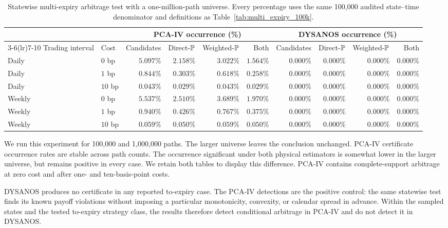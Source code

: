 \begin{table}[H]
\centering
\scriptsize
\setlength{\tabcolsep}{2pt}
\begin{tabular}{llrrrrrrrr}
\toprule
 & & \multicolumn{4}{c}{PCA-IV occurrence (\%)}
       & \multicolumn{4}{c}{DYSANOS occurrence (\%)}\\
\cmidrule(lr){3-6}\cmidrule(lr){7-10}
Trading interval & Cost & Candidates & Direct-$\P$ & Weighted-$\P$ & Both
                         & Candidates & Direct-$\P$ & Weighted-$\P$ & Both\\
\midrule
Daily  & $0$ bp  & $5.097\%$ & $2.158\%$ & $3.022\%$ & $1.564\%$ & $0.000\%$ & $0.000\%$ & $0.000\%$ & $0.000\%$\\
Daily  & $1$ bp  & $0.844\%$ & $0.303\%$ & $0.618\%$ & $0.258\%$ & $0.000\%$ & $0.000\%$ & $0.000\%$ & $0.000\%$\\
Daily  & $10$ bp & $0.043\%$ & $0.029\%$ & $0.043\%$ & $0.029\%$ & $0.000\%$ & $0.000\%$ & $0.000\%$ & $0.000\%$\\
Weekly & $0$ bp  & $5.537\%$ & $2.510\%$ & $3.689\%$ & $1.970\%$ & $0.000\%$ & $0.000\%$ & $0.000\%$ & $0.000\%$\\
Weekly & $1$ bp  & $0.940\%$ & $0.426\%$ & $0.767\%$ & $0.375\%$ & $0.000\%$ & $0.000\%$ & $0.000\%$ & $0.000\%$\\
Weekly & $10$ bp & $0.059\%$ & $0.050\%$ & $0.059\%$ & $0.050\%$ & $0.000\%$ & $0.000\%$ & $0.000\%$ & $0.000\%$\\
\bottomrule
\end{tabular}
\caption{Statewise multi-expiry arbitrage test with a one-million-path
universe. Every percentage uses the same 100,000 audited state--time
denominator and definitions as Table~\ref{tab:multi_expiry_100k}.}
\label{tab:multi_expiry_1m}
\end{table}

We run this experiment for 100,000 and 1,000,000 paths.
The larger universe leaves the conclusion unchanged. PCA-IV certificate
occurrence rates are stable across path counts. The occurrence significant
under both physical estimators is somewhat lower in
the larger universe, but remains positive in every case. We retain both
tables to display this difference. PCA-IV contains complete-support arbitrage
at zero cost and after one- and ten-basis-point costs.

DYSANOS produces no certificate in any reported to-expiry case. The PCA-IV detections are
the positive control: the same statewise test finds its known payoff
violations without imposing a particular monotonicity, convexity, or calendar
spread in advance. Within the sampled states and the tested to-expiry strategy
class, the results therefore detect conditional arbitrage in PCA-IV and do
not detect it in DYSANOS.

